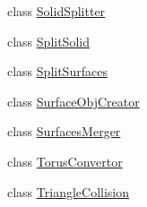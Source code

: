 \begin{DoxyCompactItemize}
class \hyperlink{classMcCAD_1_1Decomposition_1_1SolidSplitter}{Solid\+Splitter}
\item 
class \hyperlink{classMcCAD_1_1Decomposition_1_1SplitSolid}{Split\+Solid}
\item 
class \hyperlink{classMcCAD_1_1Decomposition_1_1SplitSurfaces}{Split\+Surfaces}
\item 
class \hyperlink{classMcCAD_1_1Decomposition_1_1SurfaceObjCreator}{Surface\+Obj\+Creator}
\item 
class \hyperlink{classMcCAD_1_1Decomposition_1_1SurfacesMerger}{Surfaces\+Merger}
\item 
class \hyperlink{classMcCAD_1_1Decomposition_1_1TorusConvertor}{Torus\+Convertor}
\item 
class \hyperlink{classMcCAD_1_1Decomposition_1_1TriangleCollision}{Triangle\+Collision}
\end{DoxyCompactItemize}
